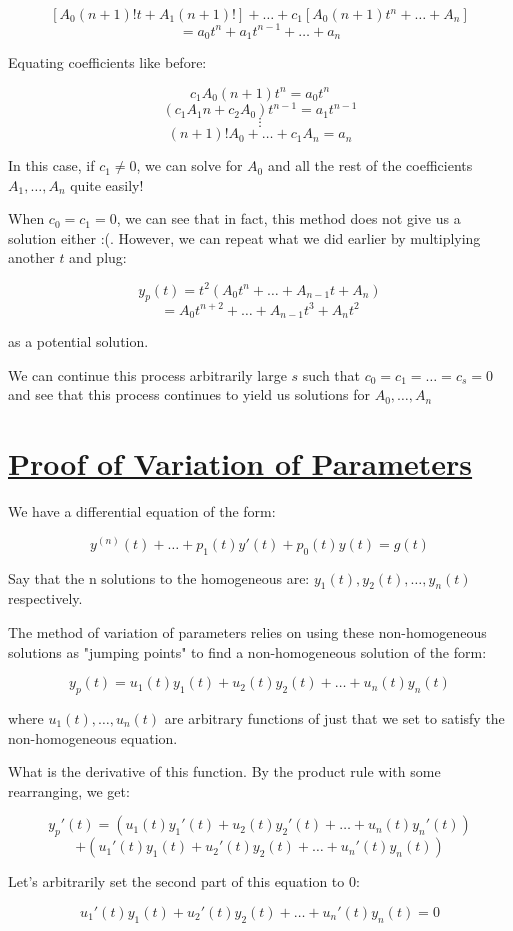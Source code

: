 \documentclass{report}
\begin{document}
$$[A_0(n+1)!t+A_1(n+1)!] + \dots + c_1[A_0(n+1)t^n+\dots + A_n]$$
$$= a_0t^n + a_1t^{n-1} + \dots + a_n$$

Equating coefficients like before:

$$c_1A_0(n+1)t^n = a_0t^n$$
$$(c_1A_1n+c_2A_0)t^{n-1} = a_1t^{n-1}$$
$$\vdots$$
$$(n+1)!A_0 + \dots + c_1A_{n} = a_n$$

In this case, if $c_1 \neq 0$, we can solve for $A_0$ and all the rest of the coefficients $A_1, \dots, A_n$ quite easily!

When $c_0=c_1=0$, we can see that in fact, this method does not give us a solution either :(. However, we can repeat what we did earlier by multiplying another $t$ and plug:

$$y_p(t) = t^2(A_0t^n + \dots + A_{n-1}t + A_n)$$
$$=A_0t^{n+2} + \dots + A_{n-1}t^3 + A_nt^2$$

as a potential solution.

We can continue this process arbitrarily large $s$ such that $c_0=c_1=\dots=c_s=0$ and see that this process continues to yield us solutions for $A_0, \dots, A_n$


\section{\hyperref[th:var]{Proof of Variation of Parameters}}
\label{sec:prVar}
We have a differential equation of the form:

$$y^{(n)}(t) + \dots + p_1(t)y'(t) + p_0(t)y(t) = g(t)$$

Say that the n solutions to the homogeneous are:
$y_1(t), y_2(t), \dots, y_n(t)$ respectively.

The method of variation of parameters relies on using these non-homogeneous solutions as "jumping points" to find a non-homogeneous solution of the form:

$$y_p(t) = u_1(t)y_1(t) + u_2(t)y_2(t) + \dots + u_n(t)y_n(t)$$

where $u_1(t), \dots, u_n(t)$ are arbitrary functions of just that we set to satisfy the non-homogeneous equation.

What is the derivative of this function. By the product rule with some rearranging, we get:

$$y_p'(t) = (u_1(t)y_1'(t) + u_2(t)y_2'(t) + \dots
+ u_n(t)y_n'(t)) $$  $$+ (u_1'(t)y_1(t) + u_2'(t)y_2(t) + \dots + u_n'(t)y_n(t))$$

Let's arbitrarily set the second part of this equation to 0:

$$u_1'(t)y_1(t) + u_2'(t)y_2(t) + \dots + u_n'(t)y_n(t) = 0$$
\end{document}
